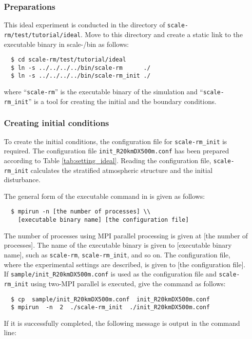 \subsubsection{Preparations} %

This ideal experiment is conducted in the directory of \verb|scale-rm/test/tutorial/ideal|.  Move to this directory and  create a static link to the executable binary in scale-{\version}/bin as follows:
\begin{verbatim}
  $ cd scale-rm/test/tutorial/ideal
  $ ln -s ../../../../bin/scale-rm      ./
  $ ln -s ../../../../bin/scale-rm_init ./
\end{verbatim}
where ``\verb|scale-rm|'' is the executable binary of the simulation
and  ``\verb|scale-rm_init|'' is a tool for creating the initial and the boundary conditions.


\subsubsection{Creating initial conditions} \label{subsec:ideal_exp_init}

To create the initial conditions, the configuration file for \verb|scale-rm_init| is required.
The configuration file \verb|init_R20kmDX500m.conf| has been prepared
according to Table \ref{tab:setting_ideal}.
Reading the configuration file, \verb|scale-rm_init| calculates the stratified atmospheric structure and the initial disturbance.

The general form of the executable command in \scalerm is given as follows:
\begin{verbatim}
  $ mpirun -n [the number of processes] \\
    [executable binary name] [the configuration file]
\end{verbatim}
The number of processes using MPI parallel processing is given at [the number of processes]. 
The name of the executable binary is given to [executable binary name],  such as \verb|scale-rm|, \verb|scale-rm_init|, and so on.  
The configuration file, where the experimental settings are described, is given to [the configuration file].
If \verb|sample/init_R20kmDX500m.conf| is used as the configuration file and 
\verb|scale-rm_init| using two-MPI parallel is executed, 
give the command as follows:
\begin{verbatim}
  $ cp  sample/init_R20kmDX500m.conf  init_R20kmDX500m.conf
  $ mpirun  -n  2  ./scale-rm_init  ./init_R20kmDX500m.conf
\end{verbatim}
\noindent
If it is successfully completed, the following message is output in the command line:

